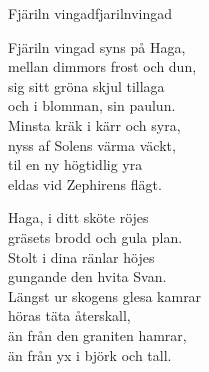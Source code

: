 \begin{song}{Fjäriln vingad}{fjarilnvingad}
\begin{vers}
Fjäriln vingad syns på Haga,\\
mellan dimmors frost och dun,\\
sig sitt gröna skjul tillaga\\
och i blomman, sin paulun.\\
Minsta kräk i kärr och syra,\\
nyss af Solens värma väckt,\\
til en ny högtidlig yra\\
eldas vid Zephirens flägt.\\
\end{vers}
\begin{vers}
Haga, i ditt sköte röjes\\
gräsets brodd och gula plan.\\
Stolt i dina ränlar höjes\\
gungande den hvita Svan.\\
Längst ur skogens glesa kamrar\\
höras täta återskall,\\
än från den graniten hamrar,\\
än från yx i björk och tall.\\
\end{vers}
\end{song}
